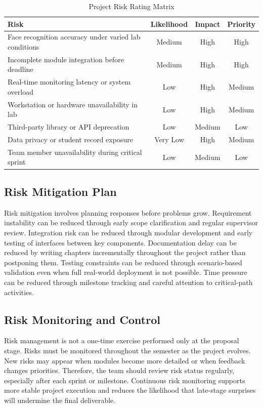 \begin{table}[H]
\centering
\caption{Project Risk Rating Matrix}
\label{tab:risk_matrix}
\renewcommand{\arraystretch}{1.2}
\begin{tabular}{>{\raggedright\arraybackslash}p{7cm}|ccc}
\hline\hline
\textbf{Risk} & \textbf{Likelihood} & \textbf{Impact} & \textbf{Priority} \\ \hline
Face recognition accuracy under varied lab conditions & Medium & High & High \\
Incomplete module integration before deadline         & Medium & High & High \\
Real-time monitoring latency or system overload       & Low    & High & Medium \\
Workstation or hardware unavailability in lab         & Low    & High & Medium \\
Third-party library or API deprecation                & Low    & Medium & Low \\
Data privacy or student record exposure               & Very Low & High & Medium \\
Team member unavailability during critical sprint     & Low    & Medium & Low \\ \hline\hline
\end{tabular}
\end{table}

\subsection{Risk Mitigation Plan}

Risk mitigation involves planning responses before problems grow. Requirement instability can be reduced through early scope clarification and regular supervisor review. Integration risk can be reduced through modular development and early testing of interfaces between key components. Documentation delay can be reduced by writing chapters incrementally throughout the project rather than postponing them. Testing constraints can be reduced through scenario-based validation even when full real-world deployment is not possible. Time pressure can be reduced through milestone tracking and careful attention to critical-path activities.

\subsection{Risk Monitoring and Control}

Risk management is not a one-time exercise performed only at the proposal stage. Risks must be monitored throughout the semester as the project evolves. New risks may appear when modules become more detailed or when feedback changes priorities. Therefore, the team should review risk status regularly, especially after each sprint or milestone. Continuous risk monitoring supports more stable project execution and reduces the likelihood that late-stage surprises will undermine the final deliverable.

